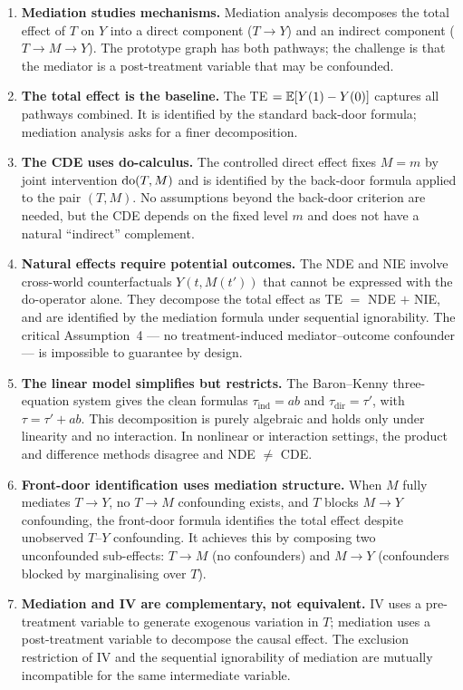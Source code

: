\documentclass[master.tex]{subfiles}
\begin{document}
\begin{enumerate}
  \item \textbf{Mediation studies mechanisms.}  Mediation analysis
    decomposes the total effect of $T$ on $Y$ into a direct component
    ($T \to Y$) and an indirect component ($T \to M \to Y$).  The
    prototype graph has both pathways; the challenge is that the
    mediator is a post-treatment variable that may be confounded.

  \item \textbf{The total effect is the baseline.}  The TE $= \mathbb{E}[Y(1)
    - Y(0)]$ captures all pathways combined.  It is identified by the
    standard back-door formula; mediation analysis asks for a finer
    decomposition.

  \item \textbf{The CDE uses do-calculus.}  The controlled direct
    effect fixes $M = m$ by joint intervention $\mathrm{do}(T, M)$ and is
    identified by the back-door formula applied to the pair $(T, M)$.
    No assumptions beyond the back-door criterion are needed, but the
    CDE depends on the fixed level $m$ and does not have a natural
    ``indirect'' complement.

  \item \textbf{Natural effects require potential outcomes.}  The NDE
    and NIE involve cross-world counterfactuals $Y(t, M(t'))$ that
    cannot be expressed with the do-operator alone.  They decompose the
    total effect as TE $=$ NDE $+$ NIE, and are identified by the
    mediation formula under sequential ignorability.  The critical
    Assumption~4 --- no treatment-induced mediator--outcome confounder
    --- is impossible to guarantee by design.

  \item \textbf{The linear model simplifies but restricts.}  The
    Baron--Kenny three-equation system gives the clean formulas
    $\tau_{\mathrm{ind}} = ab$ and $\tau_{\mathrm{dir}} = \tau'$, with
    $\tau = \tau' + ab$.  This decomposition is purely algebraic and
    holds only under linearity and no interaction.  In nonlinear or
    interaction settings, the product and difference methods disagree
    and NDE $\neq$ CDE.

  \item \textbf{Front-door identification uses mediation structure.}
    When $M$ fully mediates $T \to Y$, no $T \to M$ confounding exists,
    and $T$ blocks $M \to Y$ confounding, the front-door formula
    identifies the total effect despite unobserved $T$--$Y$ confounding.
    It achieves this by composing two unconfounded sub-effects:
    $T \to M$ (no confounders) and $M \to Y$ (confounders blocked by
    marginalising over $T$).

  \item \textbf{Mediation and IV are complementary, not equivalent.}
    IV uses a pre-treatment variable to generate exogenous variation
    in $T$; mediation uses a post-treatment variable to decompose the
    causal effect.  The exclusion restriction of IV and the sequential
    ignorability of mediation are mutually incompatible for the same
    intermediate variable.
\end{enumerate}
\end{document}
